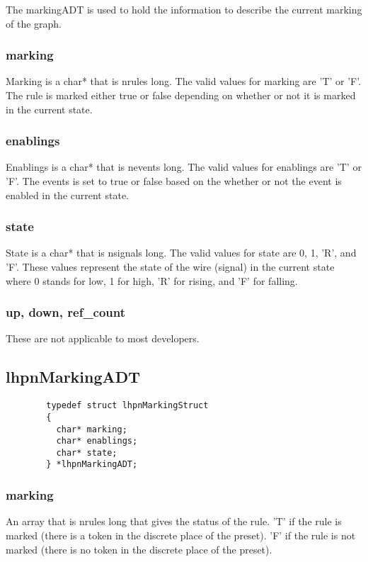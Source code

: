 \documentclass[titlepage,11pt]{article}
\begin{document}
  The markingADT is used to hold the information to describe the
  current marking of the graph.

  \subsubsection{marking}
  Marking is a char* that is nrules long.  The valid values for
  marking are 'T' or 'F'.  The rule is marked either true or false
  depending on whether or not it is marked in the current state.
  
  \subsubsection{enablings}
  Enablings is a char* that is nevents long.  The valid values for
  enablings are 'T' or 'F'.  The events is set to true or false based
  on the whether or not the event is enabled in the current state.
  
  \subsubsection{state}
  State is a char* that is nsignals long.  The valid values for state
  are 0, 1, 'R', and 'F'.  These values represent the state of the
  wire (signal) in the current state where 0 stands for low, 1 for
  high, 'R' for rising, and 'F' for falling.
  
  \subsubsection{up, down, ref\_count}
  These are not applicable to most developers.
  
	\subsection{lhpnMarkingADT}
	\begin{verbatim}
		typedef struct lhpnMarkingStruct 
		{
		  char* marking;
		  char* enablings;
		  char* state;
		} *lhpnMarkingADT;
	\end{verbatim}
	
	\subsubsection{marking}
	An array that is nrules long that gives the status of the rule.  'T' if the rule is marked (there is a token in the discrete place of the preset).  'F' if the rule is not marked (there is no token in the discrete place of the preset).
	
\end{document}
